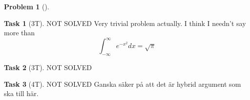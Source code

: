 \documentclass[11pt,twoside]{article}
\theoremstyle{definition}
\newtheorem{amsproblem}{Problem}
\newtheorem{amssubproblem}{Task}[amsproblem]
\newenvironment{problem}[1][]{%
  \begin{amsproblem}[#1]
  }{%
  \end{amsproblem}
}
\newenvironment{subproblem}[1][]{%
  \begin{amssubproblem}[#1]
  }{%
  \end{amssubproblem}
}
\newcommand{\TP}[1]{#1T}
\begin{document}
\begin{problem}
  \begin{subproblem}[\TP{3}]
    NOT SOLVED %
    Very trivial problem actually. I think I needn't say more than
    \[
			\int_{-\infty}^{\infty}e^{-x^2}dx = \sqrt\pi
    \]
  \end{subproblem}
  \begin{subproblem}[\TP{3}]
    NOT SOLVED %
  \end{subproblem}
  \begin{subproblem}[\TP{4}]
    NOT SOLVED Ganska säker på att det är hybrid argument som ska till här.%
  \end{subproblem}
\end{problem}

\noindent
\hrulefill
\end{document}
